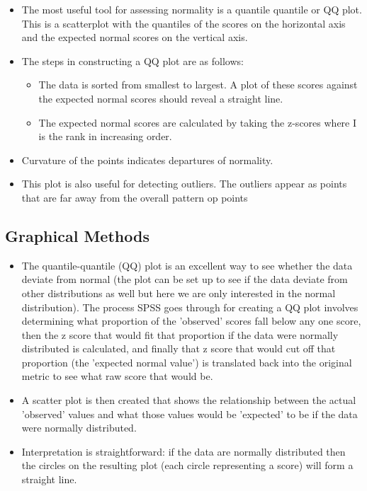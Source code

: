 \documentclass[]{report}
\begin{document}
\begin{itemize}
	\item The most useful tool for assessing normality is a quantile quantile or QQ plot. This is a scatterplot with the quantiles of the scores on the horizontal axis and the expected normal scores on the vertical axis. 
	
	\item  The steps in constructing a QQ plot are as follows: 
	
	\begin{itemize}
		\item  The data is sorted from smallest to largest. A plot of these scores against the expected normal scores should reveal a straight line. \item The expected normal scores are calculated by taking the z-scores  where I is the rank in increasing order.
	\end{itemize}
	
	\item  Curvature of the points indicates departures of normality. \item  This plot is also useful for detecting outliers. The outliers appear as points that are far away from the overall pattern op points
\end{itemize}




\subsection{Graphical Methods}

\begin{itemize}
	\item The quantile-quantile (QQ) plot is an excellent way to see whether the data deviate from normal (the plot can be set up to see if the data deviate from other distributions as well but here we are only interested in the normal distribution). The process SPSS goes through for creating a QQ plot involves determining what proportion of the 'observed' scores fall below any one score, then the z score that would fit that proportion if the data were normally distributed is calculated, and finally that z score that would cut off that proportion (the 'expected normal value') is translated back into the original metric to see what raw score that would be. 
	
	\item A scatter plot is then created that shows the relationship between the actual 'observed' values and what those values would be 'expected' to be if the data were normally distributed. 
	\item Interpretation is straightforward: if the data are normally distributed then the circles on the resulting plot (each circle representing a score) will form a straight line. 
	
\end{itemize}
\end{document}
